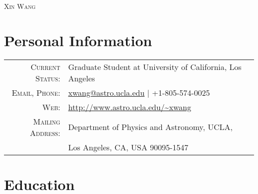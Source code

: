 \documentclass[letterpaper,12pt]{article}
\begin{document}
\par{\centering
  {\LARGE \textsc{Xin Wang}}
\par}

\section{Personal Information}
\begin{tabular}{rl}
    \textsc{Current Status:}  & Graduate Student at University of California, Los Angeles \\
    \textsc{Email, Phone:}  & \href{mailto:xwang@astro.ucla.edu}{xwang@astro.ucla.edu}  |  +1-805-574-0025  \\
    \textsc{Web:}  & \url{http://www.astro.ucla.edu/~xwang} \\
    \textsc{Mailing Address:} & Department of Physics and Astronomy, UCLA, \\
                              & Los Angeles, CA, USA 90095-1547
\end{tabular}


\section{Education}
\end{document}
